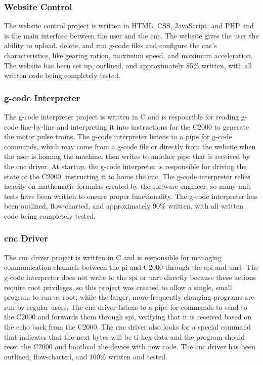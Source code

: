 \subsubsection{Website Control}
The website control project is written in HTML, CSS, JavaScript, and PHP and is the main interface between the user and the \gls{cnc}.
The website gives the user the ability to upload, delete, and run g-code files and configure the \gls{cnc}'s characteristics, like gearing ration, maximum speed, and maximum acceleration.
The website has been set up, outlined, and approximately 85\% written, with all written code being completely tested.

\subsubsection{g-code Interpreter}
The g-code interpreter project is written in C and is responsible for reading g-code line-by-line and interpreting it into instructions for the C2000 to generate the motor pulse trains.
The g-code interpreter listens to a pipe for g-code commands, which may come from a g-code file or directly from the website when the user is homing the machine, then writes to another pipe that is received by the \gls{cnc} driver.
At startup, the g-code interpreter is responsible for driving the state of the C2000, instructing it to home the \gls{cnc}.
The g-code interpreter relies heavily on mathematic formulas created by the software engineer, so many unit tests have been written to ensure proper functionality.
The g-code interpreter has been outlined, flow-charted, and approximately 90\% written, with all written code being completely tested.

\subsubsection{\gls{cnc} Driver}
The \gls{cnc} driver project is written in C and is responsible for managing communication channels between the \gls{pi} and C2000 through the \gls{spi} and \gls{uart}.
The g-code interpreter does not write to the \gls{spi} or \gls{uart} directly because these actions require root privileges, so this project was created to allow a single, small program to run as root, while the larger, more frequently changing programs are run by regular users.
The \gls{cnc} driver listens to a pipe for commands to send to the C2000 and forwards them through \gls{spi}, verifying that it is received based on the echo back from the C2000.
The \gls{cnc} driver also looks for a special command that indicates that the next bytes will be \gls{ti} hex data and the program should reset the C2000 and bootload the device with new code.
The \gls{cnc} driver has been outlined, flow-charted, and 100\% written and tested.

